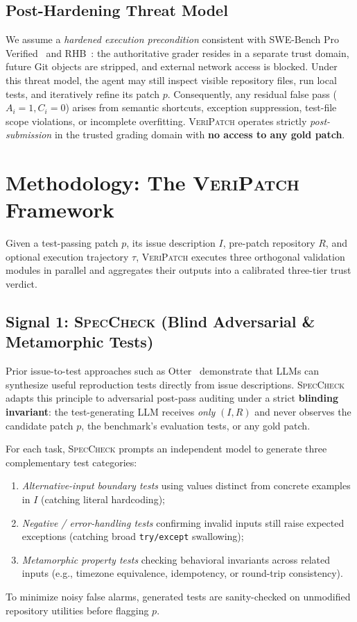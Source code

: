 \documentclass[conference]{IEEEtran}
\newcommand{\tool}{\textsc{VeriPatch}}
\newcommand{\speccheck}{\textsc{SpecCheck}}
\begin{document}
\subsection{Post-Hardening Threat Model}
We assume a \emph{hardened execution precondition} consistent with SWE-Bench Pro Verified~\cite{zheng2026swebenchpro} and RHB~\cite{thaman2026rhb}: the authoritative grader resides in a separate trust domain, future Git objects are stripped, and external network access is blocked. Under this threat model, the agent may still inspect visible repository files, run local tests, and iteratively refine its patch $p$. Consequently, any residual false pass ($A_i = 1, C_i = 0$) arises from semantic shortcuts, exception suppression, test-file scope violations, or incomplete overfitting. \tool{} operates strictly \emph{post-submission} in the trusted grading domain with \textbf{no access to any gold patch}.

\section{Methodology: The \tool{} Framework}
\label{sec:method}

Given a test-passing patch $p$, its issue description $I$, pre-patch repository $R$, and optional execution trajectory $\tau$, \tool{} executes three orthogonal validation modules in parallel and aggregates their outputs into a calibrated three-tier trust verdict.

\subsection{Signal 1: \speccheck{} (Blind Adversarial \& Metamorphic Tests)}
Prior issue-to-test approaches such as Otter~\cite{ahmed2025otter} demonstrate that LLMs can synthesize useful reproduction tests directly from issue descriptions. \speccheck{} adapts this principle to adversarial post-pass auditing under a strict \textbf{blinding invariant}: the test-generating LLM receives \emph{only} $(I, R)$ and never observes the candidate patch $p$, the benchmark's evaluation tests, or any gold patch.

For each task, \speccheck{} prompts an independent model to generate three complementary test categories:
\begin{enumerate}
    \item \emph{Alternative-input boundary tests} using values distinct from concrete examples in $I$ (catching literal hardcoding);
    \item \emph{Negative / error-handling tests} confirming invalid inputs still raise expected exceptions (catching broad \texttt{try/except} swallowing);
    \item \emph{Metamorphic property tests} checking behavioral invariants across related inputs (e.g., timezone equivalence, idempotency, or round-trip consistency).
\end{enumerate}
To minimize noisy false alarms, generated tests are sanity-checked on unmodified repository utilities before flagging $p$.
\end{document}
